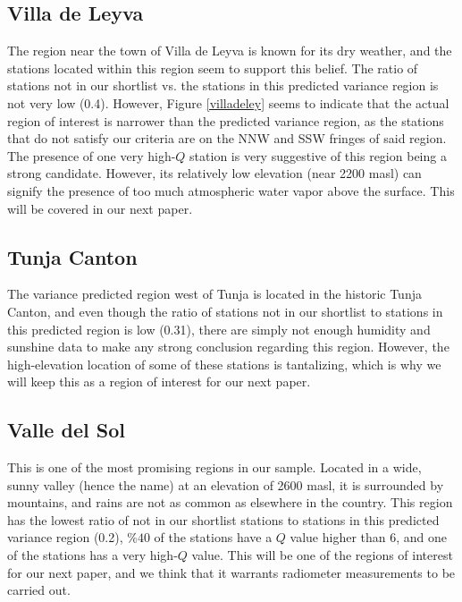 \documentclass[12pt]{iopart}
\begin{document}
\subsection{Villa de Leyva}

The region near the town of Villa de Leyva is known for its dry weather, and the stations located within this region seem to support this belief. The ratio of stations not in our shortlist vs. the stations in this predicted variance region is not very low (0.4). However, Figure \ref{villadeley} seems to indicate that the actual region of interest is narrower than the predicted variance region, as the stations that do not satisfy our criteria are on the NNW and SSW fringes of said region. The presence of one very high-$Q$ station is very suggestive of this region being a strong candidate. However, its relatively low elevation (near 2200 masl) can signify the presence of too much atmospheric water vapor above the surface. This will be covered in our next paper.

\subsection{Tunja Canton}

The variance predicted region west of Tunja is located in the historic Tunja Canton, and even though the ratio of stations not in our shortlist to stations in this predicted region is low (0.31), there are simply not enough humidity and sunshine data to make any strong conclusion regarding this region. However, the high-elevation location of some of these stations is tantalizing, which is why we will keep this as a region of interest for our next paper.


\subsection{Valle del Sol}

This is one of the most promising regions in our sample. Located in a wide, sunny valley (hence the name) at an elevation of 2600 masl, it is surrounded by mountains, and rains are not as common as elsewhere in the country. This region has the lowest ratio of not in our shortlist stations to stations in this predicted variance region (0.2), $\%40$ of the stations have a $Q$ value higher than 6, and one of the stations has a very high-$Q$ value. This will be one of the regions of interest for our next paper, and we think that it warrants radiometer measurements to be carried out.
\end{document}
